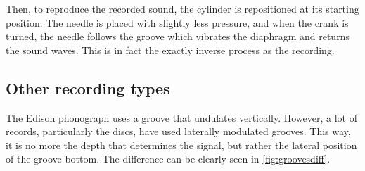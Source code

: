 Then, to reproduce the recorded sound, the cylinder is repositioned at its starting position. The needle is placed with slightly less pressure, and when the crank is turned, the needle follows the groove which vibrates the diaphragm and returns the sound waves. This is in fact the exactly inverse process as the recording.

\subsection{Other recording types}
\label{sec:rectypes}

The Edison phonograph uses a groove that undulates vertically. However, a lot of records, particularly the discs, have used laterally modulated grooves. This way, it is no more the depth that determines the signal, but rather the lateral position of the groove bottom. The difference can be clearly seen in \autoref{fig:groovesdiff}.

